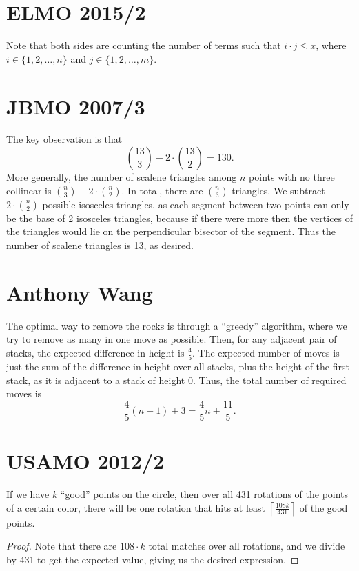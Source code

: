 \documentclass[11pt]{scrartcl}
\begin{document}
\section{ELMO 2015/2}
Note that both sides are counting the number of terms such that $i\cdot j \leq x$, where $i\in \{1, 2, \dots, n\}$ and $j \in \{1, 2, \dots, m\}$. 

\section{JBMO 2007/3}
The key observation is that \[\binom{13}{3} - 2 \cdot \binom {13}{2} = 130.\] More generally, the number of scalene triangles among $n$ points with no three collinear is $\binom{n}{3} - 2\cdot \binom{n}{2}$. In total, there are $\binom{n}{3}$ triangles. We subtract $2\cdot \binom{n}{2}$ possible isosceles triangles, as each segment between two points can only be the base of 2 isosceles triangles, because if there were more then the vertices of the triangles would lie on the perpendicular bisector of the segment. Thus the number of scalene triangles is 13, as desired. 

\section{Anthony Wang}
The optimal way to remove the rocks is through a ``greedy'' algorithm, where we try to remove as many in one move as possible. Then, for any adjacent pair of stacks, the expected difference in height is $\frac{4}{5}$. The expected number of moves is just the sum of the difference in height over all stacks, plus the height of the first stack, as it is adjacent to a stack of height 0. Thus, the total number of required moves is \[\frac{4}{5}(n-1) + 3 = \frac{4}{5}n + \frac{11}{5}.\]

\section{USAMO 2012/2}
\begin{claim}
If we have $k$ ``good'' points on the circle, then over all 431 rotations of the points of a certain color, there will be one rotation that hits at least $\left \lceil \frac{108k}{431} \right \rceil$ of the good points.
\end{claim}
\begin{proof}
Note that there are $108 \cdot k$ total matches over all rotations, and we divide by 431 to get the expected value, giving us the desired expression.
\end{proof}
\end{document}

